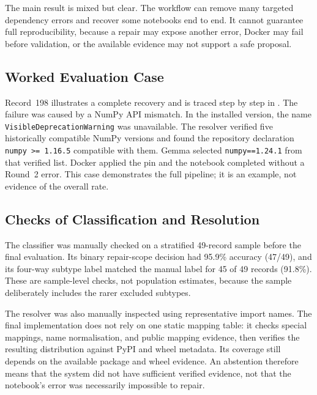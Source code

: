The main result is mixed but clear. The workflow can remove many targeted
dependency errors and recover some notebooks end to end. It cannot guarantee
full reproducibility, because a repair may expose another error, Docker may
fail before validation, or the available evidence may not support a safe
proposal.
\label{sec:v-final-breakdown}
\label{sec:v-final-interpretation}

\subsection{Worked Evaluation Case}
\label{sec:v-case-study}

Record~198 illustrates a complete recovery and is traced step by step in
. The failure was caused by a NumPy API mismatch. In the installed version,
the name \texttt{VisibleDeprecationWarning} was unavailable. The resolver
verified five historically compatible NumPy versions and found the repository
declaration \texttt{numpy >= 1.16.5} compatible with them. Gemma selected
\texttt{numpy==1.24.1} from that verified list. Docker applied the pin and the
notebook completed without a Round~2 error. This case demonstrates the full
pipeline; it is an example, not evidence of the overall rate.

\subsection{Checks of Classification and Resolution}
\label{sec:v-final-subtype}

The classifier was manually checked on a stratified 49-record sample before
the final evaluation. Its binary repair-scope decision had 95.9\% accuracy
(47/49), and its four-way subtype label matched the manual label for 45 of 49
records (91.8\%). These are sample-level checks, not population estimates,
because the sample deliberately includes the rarer excluded subtypes.
\label{sec:v-final-classifier}

The resolver was also manually inspected using representative import names.
The final implementation does not rely on one static mapping table: it checks
special mappings, name normalisation, and public mapping evidence, then verifies
the resulting distribution against PyPI and wheel metadata. Its coverage still
depends on the available package and wheel evidence. An abstention therefore
means that the system did not have sufficient verified evidence, not that the
notebook's error was necessarily impossible to repair.
\label{sec:v-final-pypi}

